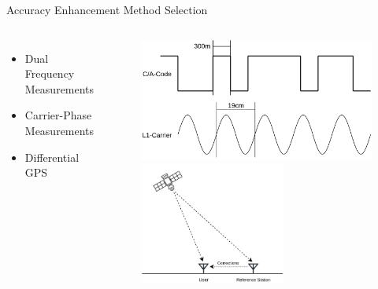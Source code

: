 \documentclass[12pt, compress, xcolor=table]{beamer}
\begin{document}
\begin{frame}{Accuracy Enhancement Method Selection}
 \begin{columns}
  
  \begin{itemize}
   \setlength\itemsep{0.5cm}
   \item Dual Frequency Measurements
   \item Carrier-Phase Measurements
   \item Differential GPS
  \end{itemize}
  
  \begin{figure}
   \includegraphics[width=\textwidth]{images/Carrier_Phase_Measurement.png}
   
   \includegraphics[height=4cm]{images/Differential_GPS.png}
  \end{figure}
  
 \end{columns}
\end{frame}
\end{document}
